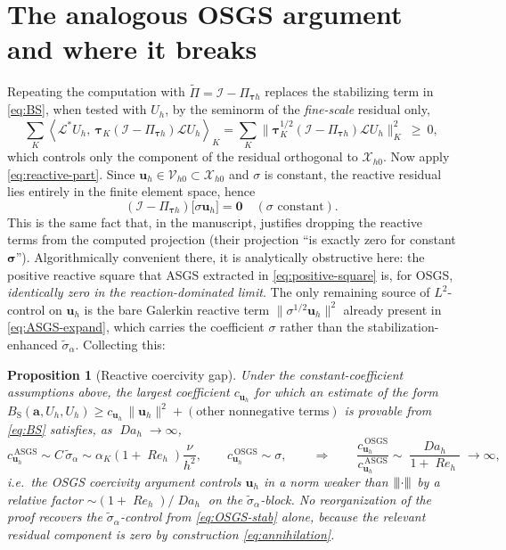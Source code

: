 \documentclass[11pt]{article}
\newcommand{\Reyn}{\operatorname{\mathit{Re}}}
\newcommand{\Damk}{\operatorname{\mathit{Da}}}
\newcommand{\triplenorm}[1]{{\left\vert\kern-0.25ex\left\vert\kern-0.25ex\left\vert #1
\right\vert\kern-0.25ex\right\vert\kern-0.25ex\right\vert}}
\newcommand{\dualpairing}[1]{\left\langle #1\right\rangle}
\theoremstyle{plain}
\newtheorem{proposition}{Proposition}
\theoremstyle{remark}
\newcommand{\uh}{\boldsymbol{u}_h}
\newcommand{\Uh}{U_h}
\newcommand{\Xh}{\mathcal{X}_{h0}}
\newcommand{\Pio}{\Pi_{\boldsymbol{\tau}h}}            %
\newcommand{\Porth}{\widetilde{\Pi}}                  %
\newcommand{\siga}{\widetilde{\sigma}_\alpha}
\begin{document}
\section{The analogous OSGS argument and where it breaks}
Repeating the computation with $\Porth=\mathcal{I}-\Pio$ replaces the stabilizing
term in \cref{eq:BS}, when tested with $\Uh$, by the seminorm of the
\emph{fine-scale} residual only,
%
\begin{equation}\label{eq:OSGS-stab}
  \sum_K\dualpairing{\mathcal{L}^*\Uh,\ \boldsymbol{\tau}_K(\mathcal{I}-\Pio)\mathcal{L}\Uh}_K
  = \sum_K\big\|\boldsymbol{\tau}_K^{1/2}(\mathcal{I}-\Pio)\mathcal{L}\Uh\big\|_K^2 \ \ge\ 0 ,
\end{equation}
%
which controls only the component of the residual orthogonal to $\Xh$. Now apply
\cref{eq:reactive-part}. Since $\uh\in\mathcal{V}_{h0}\subset\Xh$ and $\sigma$ is
constant, the reactive residual lies entirely in the finite element space, hence
%
\begin{equation}\label{eq:annihilation}
  \boxed{\;(\mathcal{I}-\Pio)\big[\sigma\uh\big]=\boldsymbol{0}\quad(\sigma\text{ constant}).\;}
\end{equation}
%
This is the same fact that, in the manuscript, justifies dropping the reactive
terms from the computed projection (their projection ``is exactly zero for
constant $\boldsymbol{\sigma}$''). Algorithmically convenient there, it is
analytically obstructive here: the positive reactive square that ASGS extracted in
\cref{eq:positive-square} is, for OSGS, \emph{identically zero in the
reaction-dominated limit}. The only remaining source of $L^2$-control on $\uh$ is
the bare Galerkin reactive term $\|\sigma^{1/2}\uh\|^2$ already present in
\cref{eq:ASGS-expand}, which carries the coefficient $\sigma$ rather than the
stabilization-enhanced $\siga$. Collecting this:

\begin{proposition}[Reactive coercivity gap]\label{prop:gap}
Under the constant-coefficient assumptions above, the largest coefficient
$c_{\uh}$ for which an estimate of the form
$B_\text{S}(\boldsymbol{a},\Uh,\Uh)\ge c_{\uh}\,\|\uh\|^2+(\text{other nonnegative terms})$
is provable from \cref{eq:BS} satisfies, as $\Damk_h\to\infty$,
\begin{equation}\label{eq:gap}
  c_{\uh}^{\,\mathrm{ASGS}}\sim C\,\siga\sim\alpha_K(1+\Reyn_h)\frac{\nu}{h^2},
  \qquad
  c_{\uh}^{\,\mathrm{OSGS}}\sim \sigma,
  \qquad\Longrightarrow\qquad
  \frac{c_{\uh}^{\,\mathrm{OSGS}}}{c_{\uh}^{\,\mathrm{ASGS}}}\sim\frac{\Damk_h}{1+\Reyn_h}\to\infty,
\end{equation}
i.e.\ the OSGS coercivity argument controls $\uh$ in a norm weaker than
$\triplenorm{\cdot}$ by a relative factor $\sim(1+\Reyn_h)/\Damk_h$ on the
$\siga$-block. No reorganization of the proof recovers the $\siga$-control from
\cref{eq:OSGS-stab} alone, because the relevant residual component is zero by
construction \eqref{eq:annihilation}.
\end{proposition}
\end{document}
